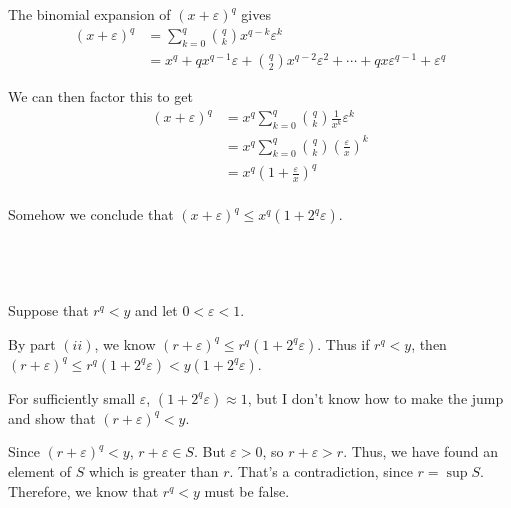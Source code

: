 \documentclass[a4paper]{article}
\begin{document}
\subsection{~}

The binomial expansion of $(x + \varepsilon)^q$ gives \begin{align*}
	(x + \varepsilon)^q &= \sum_{k=0}^q \binom{q}{k} x^{q-k} \varepsilon^k\\[1ex]
						&= x^q + q x^{q-1} \varepsilon + \binom{q}{2} x^{q-2} \varepsilon^2 + \cdots + q x \varepsilon^{q-1} + \varepsilon^q
\end{align*}

We can then factor this to get \begin{align*}
	(x + \varepsilon)^q &= x^q \sum_{k=0}^q \binom{q}{k} \frac1{x^k} \varepsilon^k\\[1ex]
						&= x^q \sum_{k=0}^q \binom{q}{k} \left( \frac{\varepsilon}{x} \right)^k\\[1ex]
						&= x^q \left( 1 + \frac{\varepsilon}{x} \right)^q\\[1ex]
\end{align*}

Somehow we conclude that $(x + \varepsilon)^q \le x^q \left( 1 + 2^q \varepsilon \right)$.

\subsection{~}

Suppose that $r^q < y$ and let $0 < \varepsilon < 1$.

By part $(ii)$, we know $(r + \varepsilon)^q \le r^q (1 + 2^q \varepsilon)$. Thus if $r^q < y$, then $(r + \varepsilon)^q \le r^q (1 + 2^q \varepsilon) < y (1 + 2^q \varepsilon)$.

For sufficiently small $\varepsilon$, $(1 + 2^q \varepsilon) \approx 1$, but I don't know how to make the jump and show that $(r + \varepsilon)^q < y$.

Since $(r + \varepsilon)^q < y$, $r + \varepsilon \in S$. But $\varepsilon > 0$, so $r + \varepsilon > r$. Thus, we have found an element of $S$ which is greater than $r$. That's a contradiction, since $r = \sup S$. Therefore, we know that $r^q < y$ must be false.

\subsection{~}
\end{document}
